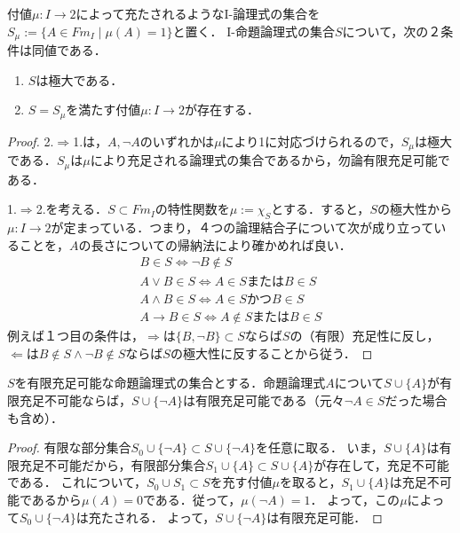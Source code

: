 \documentclass[uplatex, 12pt, dvipdfmx]{jsreport}
\begin{document}
\begin{proposition}[極大性の特徴付け]\label{prop-characterization-of-maximality}
    付値$\mu:I\to 2$によって充たされるようなI-論理式の集合を$S_\mu:=\{A\in Fm_I\mid \mu(A)=1\}$と置く．
    I-命題論理式の集合$S$について，次の２条件は同値である．
    \begin{enumerate}
        \item $S$は極大である．
        \item $S=S_\mu$を満たす付値$\mu:I\to 2$が存在する．
    \end{enumerate}
\end{proposition}
\begin{proof}
    2.$\Rightarrow$1.は，$A,\lnot A$のいずれかは$\mu$により1に対応づけられるので，$S_\mu$は極大である．$S_\mu$は$\mu$により充足される論理式の集合であるから，勿論有限充足可能である．

    1.$\Rightarrow$2.を考える．$S\subset Fm_I$の特性関数を$\mu:=\chi_S$とする．すると，$S$の極大性から$\mu:I\to 2$が定まっている．つまり，４つの論理結合子について次が成り立っていることを，$A$の長さについての帰納法により確かめれば良い．
    \begin{align*}
        B\in S\Leftrightarrow \lnot B\notin S\\
        A\lor B\in S\Leftrightarrow A\in SまたはB\in S\\
        A\land B\in S\Leftrightarrow A\in SかつB\in S\\
        A\to B\in S\Leftrightarrow A\notin SまたはB\in S
    \end{align*}
    例えば１つ目の条件は，$\Rightarrow$は$\{B,\lnot B\}\subset S$ならば$S$の（有限）充足性に反し，
    $\Leftarrow$は$B\notin S\land \lnot B\notin S$ならば$S$の極大性に反することから従う．
\end{proof}

\begin{lemma}
    $S$を有限充足可能な命題論理式の集合とする．命題論理式$A$について$S\cup\{A\}$が有限充足不可能ならば，$S\cup\{\lnot A\}$は有限充足可能である（元々$\lnot A\in S$だった場合も含め）．
\end{lemma}
\begin{proof}
    有限な部分集合$S_0\cup\{\lnot A\}\subset S\cup\{\lnot A\}$を任意に取る．
    いま，$S\cup\{A\}$は有限充足不可能だから，有限部分集合$S_1\cup\{A\}\subset S\cup\{A\}$が存在して，充足不可能である．
    これについて，$S_0\cup S_1\subset S$を充す付値$\mu$を取ると，$S_1\cup\{A\}$は充足不可能であるから$\mu(A)=0$である．従って，$\mu(\lnot A)=1$．
    よって，この$\mu$によって$S_0\cup\{\lnot A\}$は充たされる．
    よって，$S\cup\{\lnot A\}$は有限充足可能．
\end{proof}
\end{document}
